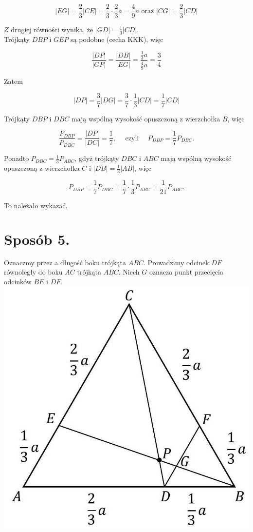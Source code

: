 \documentclass[10pt]{article}
\begin{document}
$$
|E G|=\frac{2}{3}|C E|=\frac{2}{3} \cdot \frac{2}{3} a=\frac{4}{9} a \text { oraz }|C G|=\frac{2}{3}|C D|
$$

$Z$ drugiej równości wynika, że $|G D|=\frac{1}{3}|C D|$.\\
Trójkąty $D B P$ i $G E P$ są podobne (cecha KKK), więc

$$
\frac{|D P|}{|G P|}=\frac{|D B|}{|E G|}=\frac{\frac{1}{3} a}{\frac{4}{9} a}=\frac{3}{4}
$$

Zatem

$$
|D P|=\frac{3}{7}|D G|=\frac{3}{7} \cdot \frac{1}{3}|C D|=\frac{1}{7}|C D|
$$

Trójkąty $D B P$ i $D B C$ mają wspólną wysokość opuszczoną z wierzchołka $B$, więc

$$
\frac{P_{D B P}}{P_{D B C}}=\frac{|D P|}{|D C|}=\frac{1}{7}, \quad \text { czyli } \quad P_{D B P}=\frac{1}{7} P_{D B C} .
$$

Ponadto $P_{D B C}=\frac{1}{3} P_{A B C}$, gdyż trójkąty $D B C$ i $A B C$ mają wspólną wysokość opuszczoną z wierzchołka $C$ i $|D B|=\frac{1}{3}|A B|$, więc

$$
P_{D B P}=\frac{1}{7} P_{D B C}=\frac{1}{7} \cdot \frac{1}{3} P_{A B C}=\frac{1}{21} P_{A B C} .
$$

To należało wykazać.

\section*{Sposób 5.}
Oznaczmy przez a długość boku trójkąta $A B C$. Prowadzimy odcinek $D F$ równoległy do boku $A C$ trójkąta $A B C$. Niech $G$ oznacza punkt przecięcia odcinków $B E$ i $D F$.\\
\includegraphics[max width=\textwidth, center]{2025_02_07_36131546116d12814c9cg-15}
\end{document}
